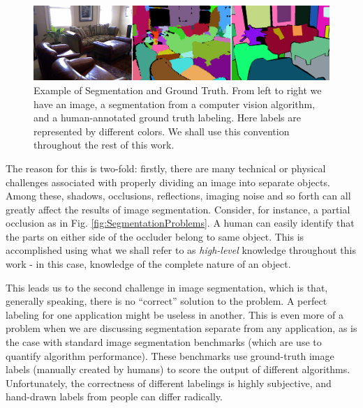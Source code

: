 \begin{figure}
\label{fig:SegmentationExample}
\centering
\includegraphics[width=\linewidth]{figures/Introduction/segmentation_GT_example.png}
\caption[Example of Segmentation and Ground Truth]{Example of Segmentation and Ground Truth. From left to right we have an image, a segmentation from a computer vision algorithm, and a human-annotated ground truth labeling. Here labels are represented by different colors. We shall use this convention throughout the rest of this work.}
\end{figure}

The reason for this is two-fold: firstly, there are many technical or physical challenges associated with properly dividing an image into separate objects. Among these, shadows, occlusions, reflections, imaging noise and so forth can all greatly affect the results of image segmentation. Consider, for instance, a partial occlusion as in Fig. \ref{fig:SegmentationProblems}. A human can easily identify that the parts on either side of the occluder belong to same object. This is accomplished using what we shall refer to as \emph{high-level} knowledge throughout this work - in this case, knowledge of the complete nature of an object. 

This leads us to the second challenge in image segmentation, which is that, generally speaking, there is no ``correct'' solution to the problem. A perfect labeling for one application might be useless in another. This is even more of a problem when we are discussing segmentation separate from any application, as is the case with standard image segmentation benchmarks (which are use to quantify algorithm performance). These benchmarks use ground-truth image labels (manually created by humans) to score the output of different algorithms. Unfortunately, the correctness of different labelings is highly subjective, and hand-drawn labels from  people can differ radically.

